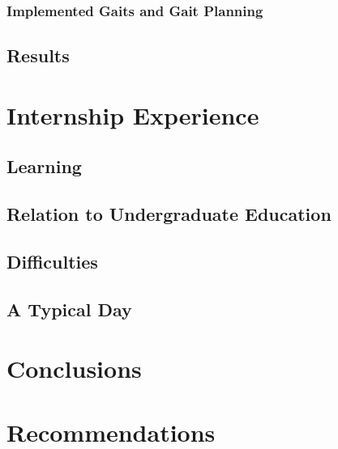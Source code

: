 \documentclass[12pt]{article}
\begin{document}
\subsubsection{Implemented Gaits and Gait Planning}
\label{sec:gaits}

\subsection{Results}
\label{subsec:results}



\section{Internship Experience}
\label{sec:internship-experience}
\subsection{Learning}
\label{subsec:learning}

\subsection{Relation to Undergraduate Education}
\label{subsec:relation-education}

\subsection{Difficulties}
\label{subsec:difficulties}

\subsection{A Typical Day}
\label{subsec:typical-day}

\section{Conclusions}
\label{sec:conclusions}

\section{Recommendations}
\label{sec:recommendations}

\newpage
\begingroup
{}
\setlength{\bibsep}{1em}   %
\renewcommand{\bibsection}{\section*{\centering References}\addcontentsline{toc}{section}{References}}


\endgroup
\end{document}
